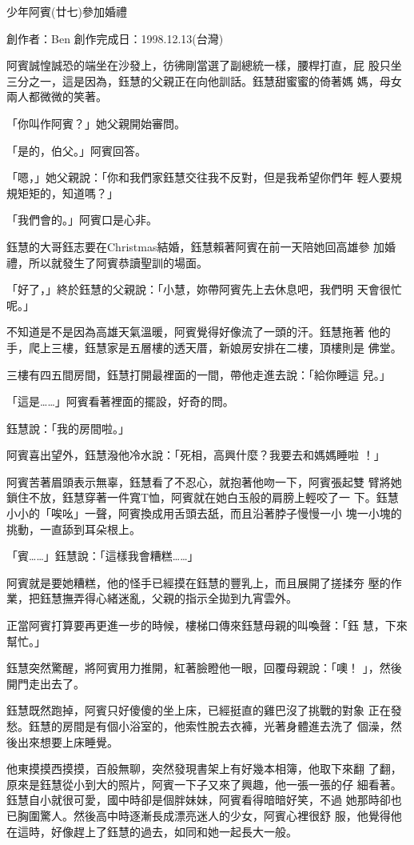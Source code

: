 



少年阿賓(廿七)參加婚禮

創作者：Ben
創作完成日：1998.12.13(台灣)


阿賓誠惶誠恐的端坐在沙發上，彷彿剛當選了副總統一樣，腰桿打直，屁
股只坐三分之一，這是因為，鈺慧的父親正在向他訓話。鈺慧甜蜜蜜的倚著媽
媽，母女兩人都微微的笑著。

「你叫作阿賓？」她父親開始審問。

「是的，伯父。」阿賓回答。

「嗯，」她父親說：「你和我們家鈺慧交往我不反對，但是我希望你們年
輕人要規規矩矩的，知道嗎？」

「我們會的。」阿賓口是心非。

鈺慧的大哥鈺志要在Christmas結婚，鈺慧賴著阿賓在前一天陪她回高雄參
加婚禮，所以就發生了阿賓恭讀聖訓的場面。

「好了，」終於鈺慧的父親說：「小慧，妳帶阿賓先上去休息吧，我們明
天會很忙呢。」

不知道是不是因為高雄天氣溫暖，阿賓覺得好像流了一頭的汗。鈺慧拖著
他的手，爬上三樓，鈺慧家是五層樓的透天厝，新娘房安排在二樓，頂樓則是
佛堂。

三樓有四五間房間，鈺慧打開最裡面的一間，帶他走進去說：「給你睡這
兒。」

「這是……」阿賓看著裡面的擺設，好奇的問。

鈺慧說：「我的房間啦。」

阿賓喜出望外，鈺慧潑他冷水說：「死相，高興什麼？我要去和媽媽睡啦
！」

阿賓苦著眉頭表示無辜，鈺慧看了不忍心，就抱著他吻一下，阿賓張起雙
臂將她鎖住不放，鈺慧穿著一件寬T恤，阿賓就在她白玉般的肩膀上輕咬了一
下。鈺慧小小的「唉吆」一聲，阿賓換成用舌頭去舐，而且沿著脖子慢慢一小
塊一小塊的挑動，一直舔到耳朵根上。

「賓……」鈺慧說：「這樣我會糟糕……」

阿賓就是要她糟糕，他的怪手已經摸在鈺慧的豐乳上，而且展開了搓揉夯
壓的作業，把鈺慧撫弄得心緒迷亂，父親的指示全拋到九宵雲外。

正當阿賓打算要再更進一步的時候，樓梯口傳來鈺慧母親的叫喚聲：「鈺
慧，下來幫忙。」

鈺慧突然驚醒，將阿賓用力推開，紅著臉瞪他一眼，回覆母親說：「噢！
」，然後開門走出去了。

鈺慧既然跑掉，阿賓只好傻傻的坐上床，已經挺直的雞巴沒了挑戰的對象
正在發愁。鈺慧的房間是有個小浴室的，他索性脫去衣褲，光著身體進去洗了
個澡，然後出來想要上床睡覺。

他東摸摸西摸摸，百般無聊，突然發現書架上有好幾本相簿，他取下來翻
了翻，原來是鈺慧從小到大的照片，阿賓一下子又來了興趣，他一張一張的仔
細看著。鈺慧自小就很可愛，國中時卻是個胖妹妹，阿賓看得暗暗好笑，不過
她那時卻也已胸圍驚人。然後高中時逐漸長成漂亮迷人的少女，阿賓心裡很舒
服，他覺得他在這時，好像趕上了鈺慧的過去，如同和她一起長大一般。

